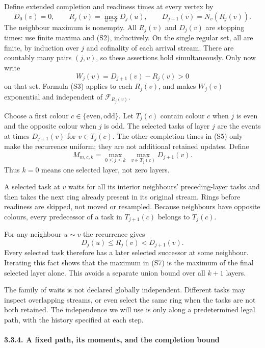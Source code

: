 \documentclass[
  11pt,
  a4paper,
]{article}
\begin{document}
Define extended completion and readiness times at every vertex by \[
D_0(v)=0,\qquad
R_j(v)=\max_{u\sim v}D_j(u),\qquad
D_{j+1}(v)=N_v(R_j(v)).
\tag{S5}
\] The neighbour maximum is nonempty. All \(R_j(v)\) and \(D_j(v)\) are
stopping times: use finite maxima and (S2), inductively. On the single
regular set, all are finite, by induction over \(j\) and cofinality of
each arrival stream. There are countably many pairs \((j,v)\), so these
assertions hold simultaneously. Only now write \[
W_j(v)=D_{j+1}(v)-R_j(v)>0
\tag{S6}
\] on that set. Formula (S3) applies to each \(R_j(v)\), and makes
\(W_j(v)\) exponential and independent of \(\mathcal F_{R_j(v)}\).

Choose a first colour \(c\in\{\text{even},\text{odd}\}\). Let \(T_j(c)\)
contain colour \(c\) when \(j\) is even and the opposite colour when
\(j\) is odd. The selected tasks of layer \(j\) are the events at times
\(D_{j+1}(v)\) for \(v\in T_j(c)\). The other completion times in (S5)
only make the recurrence uniform; they are not additional retained
updates. Define \[
M_{m,c,k}=\max_{0\leq j\leq k}\ \max_{v\in T_j(c)}D_{j+1}(v).
\tag{S7}
\] Thus \(k=0\) means one selected layer, not zero layers.

A selected task at \(v\) waits for all its interior neighbours'
preceding-layer tasks and then takes the next ring already present in
its original stream. Rings before readiness are skipped, not moved or
resampled. Because neighbours have opposite colours, every predecessor
of a task in \(T_{j+1}(c)\) belongs to \(T_j(c)\).

For any neighbour \(u\sim v\) the recurrence gives \[
D_j(u)\leq R_j(v)<D_{j+1}(v).
\tag{S8}
\] Every selected task therefore has a later selected successor at some
neighbour. Iterating this fact shows that the maximum in (S7) is the
maximum of the final selected layer alone. This avoids a separate union
bound over all \(k+1\) layers.

The family of waits is not declared globally independent. Different
tasks may inspect overlapping streams, or even select the same ring when
the tasks are not both retained. The independence we will use is only
along a predetermined legal path, with the history specified at each
step.

\paragraph{3.3.4. A fixed path, its moments, and the completion
bound}\label{a-fixed-path-its-moments-and-the-completion-bound}
\end{document}
